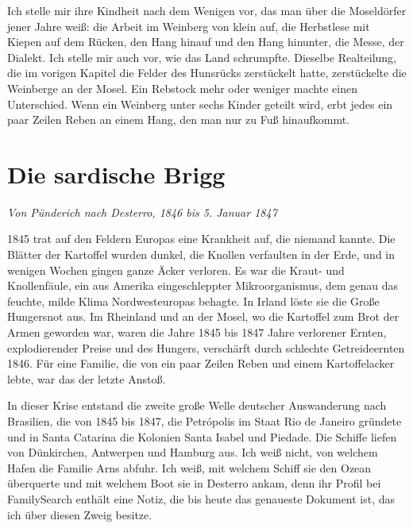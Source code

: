 \documentclass[
  ngerman,
  11pt,
  openany]{book}
\begin{document}
Ich stelle mir ihre Kindheit nach dem Wenigen vor, das man über die
Moseldörfer jener Jahre weiß: die Arbeit im Weinberg von klein auf, die
Herbstlese mit Kiepen auf dem Rücken, den Hang hinauf und den Hang
hinunter, die Messe, der Dialekt. Ich stelle mir auch vor, wie das Land
schrumpfte. Dieselbe Realteilung, die im vorigen Kapitel die Felder des
Hunsrücks zerstückelt hatte, zerstückelte die Weinberge an der Mosel.
Ein Rebstock mehr oder weniger machte einen Unterschied. Wenn ein
Weinberg unter sechs Kinder geteilt wird, erbt jedes ein paar Zeilen
Reben an einem Hang, den man nur zu Fuß hinaufkommt.

\section{Die sardische Brigg}\label{die-sardische-brigg}

\emph{Von Pünderich nach Desterro, 1846 bis 5. Januar 1847}

1845 trat auf den Feldern Europas eine Krankheit auf, die niemand
kannte. Die Blätter der Kartoffel wurden dunkel, die Knollen verfaulten
in der Erde, und in wenigen Wochen gingen ganze Äcker verloren. Es war
die Kraut- und Knollenfäule, ein aus Amerika eingeschleppter
Mikroorganismus, dem genau das feuchte, milde Klima Nordwesteuropas
behagte. In Irland löste sie die Große Hungersnot aus. Im Rheinland und
an der Mosel, wo die Kartoffel zum Brot der Armen geworden war, waren
die Jahre 1845 bis 1847 Jahre verlorener Ernten, explodierender Preise
und des Hungers, verschärft durch schlechte Getreideernten 1846. Für
eine Familie, die von ein paar Zeilen Reben und einem Kartoffelacker
lebte, war das der letzte Anstoß.

In dieser Krise entstand die zweite große Welle deutscher Auswanderung
nach Brasilien, die von 1845 bis 1847, die Petrópolis im Staat Rio de
Janeiro gründete und in Santa Catarina die Kolonien Santa Isabel und
Piedade. Die Schiffe liefen von Dünkirchen, Antwerpen und Hamburg aus.
Ich weiß nicht, von welchem Hafen die Familie Arns abfuhr. Ich weiß, mit
welchem Schiff sie den Ozean überquerte und mit welchem Boot sie in
Desterro ankam, denn ihr Profil bei FamilySearch enthält eine Notiz, die
bis heute das genaueste Dokument ist, das ich über diesen Zweig besitze.
\end{document}
